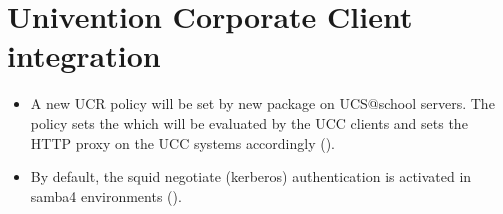 \section{Univention Corporate Client integration}
\begin{itemize}
\item A new UCR policy will be set by new package  on UCS@school
  servers. The policy sets the  which will be evaluated by the UCC clients and sets
  the HTTP proxy on the UCC systems accordingly ().
\item By default, the squid negotiate (kerberos) authentication is activated
in samba4 environments ().
\end{itemize}


 




